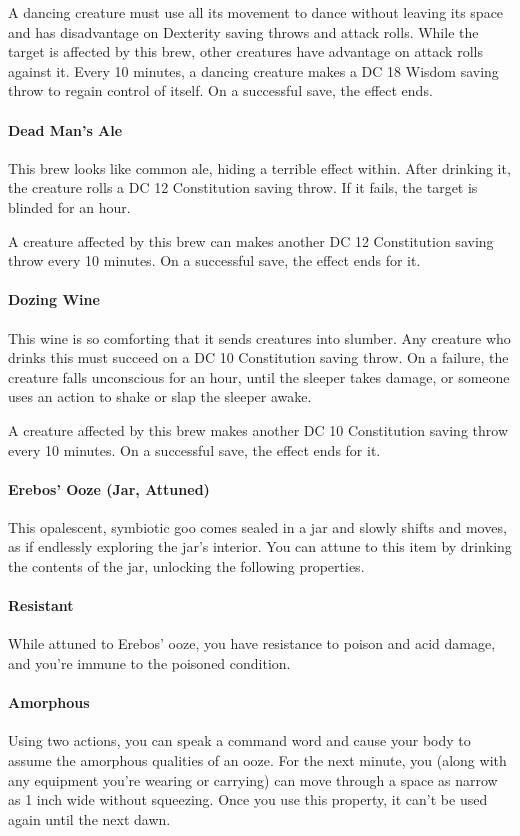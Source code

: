     A dancing creature must use all its movement to dance without leaving its space and has disadvantage on Dexterity saving throws and attack rolls.
    While the target is affected by this brew, other creatures have advantage on attack rolls against it.
    Every 10 minutes, a dancing creature makes a DC 18 Wisdom saving throw to regain control of itself.
    On a successful save, the effect ends.
\paragraph{Dead Man's Ale} %
    This brew looks like common ale, hiding a terrible effect within.
    After drinking it, the creature rolls a DC 12 Constitution saving throw.
    If it fails, the target is blinded for an hour.

    A creature affected by this brew can makes another DC 12 Constitution saving throw every 10 minutes.
    On a successful save, the effect ends for it.
\paragraph{Dozing Wine} %
    This wine is so comforting that it sends creatures into slumber.
    Any creature who drinks this must succeed on a DC 10 Constitution saving throw.
    On a failure, the creature falls unconscious for an hour, until the sleeper takes damage, or someone uses an action to shake or slap the sleeper awake.

    A creature affected by this brew makes another DC 10 Constitution saving throw every 10 minutes.
    On a successful save, the effect ends for it.
\paragraph{Erebos' Ooze (Jar, Attuned)} \label{item::erebosooze} %
    This opalescent, symbiotic goo comes sealed in a jar and slowly shifts and moves, as if endlessly exploring the jar's interior.
    You can attune to this item by drinking the contents of the jar, unlocking the following properties.

    \paragraph{Resistant} While attuned to Erebos' ooze, you have resistance to poison and acid damage, and you're immune to the poisoned condition.
    \paragraph{Amorphous} Using two actions, you can speak a command word and cause your body to assume the amorphous qualities of an ooze.
    For the next minute, you (along with any equipment you're wearing or carrying) can move through a space as narrow as 1 inch wide without squeezing.
    Once you use this property, it can't be used again until the next dawn.
